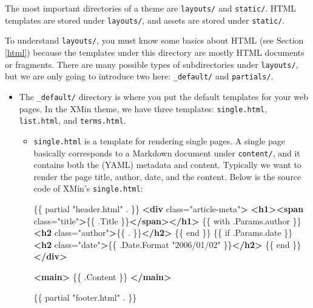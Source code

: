 \documentclass[12pt,]{krantz}
\makeatletter
\newenvironment{Shaded}{\begin{snugshade}}{\end{snugshade}}
\newcommand{\KeywordTok}[1]{\textcolor[rgb]{0.13,0.29,0.53}{\textbf{#1}}}
\newcommand{\NormalTok}[1]{#1}
\newcommand{\OtherTok}[1]{\textcolor[rgb]{0.56,0.35,0.01}{#1}}
\newcommand{\StringTok}[1]{\textcolor[rgb]{0.31,0.60,0.02}{#1}}
\newenvironment{kframe}{%
\medskip{}
\setlength{\fboxsep}{.8em}
 \def\at@end@of@kframe{}%
 \ifinner\ifhmode%
  \def\at@end@of@kframe{\end{minipage}}%
  \begin{minipage}{\columnwidth}%
 \fi\fi%
 \def\FrameCommand##1{\hskip\@totalleftmargin \hskip-\fboxsep
 \colorbox{shadecolor}{##1}\hskip-\fboxsep
     \hskip-\linewidth \hskip-\@totalleftmargin \hskip\columnwidth}%
 \MakeFramed {\advance\hsize-\width
   \@totalleftmargin\z@ \linewidth\hsize
   \@setminipage}}%
 {\par\unskip\endMakeFramed%
 \at@end@of@kframe}
\renewenvironment{Shaded}{\begin{kframe}}{\end{kframe}}
\theoremstyle{definition}
\theoremstyle{definition}
\theoremstyle{definition}
\theoremstyle{remark}
\makeatother
\begin{document}
The most important directories of a theme are \texttt{layouts/} and
\texttt{static/}. HTML templates are stored under \texttt{layouts/}, and
assets are stored under \texttt{static/}.

To understand \texttt{layouts/}, you must know some basics about HTML
(see Section \ref{html}) because the templates under this directory are
mostly HTML documents or fragments. There are many possible types of
subdirectories under \texttt{layouts/}, but we are only going to
introduce two here: \texttt{\_default/} and \texttt{partials/}.

\begin{itemize}
\item
  The \texttt{\_default/} directory is where you put
  the default templates for your web pages. In the XMin theme, we have
  three templates: \texttt{single.html}, \texttt{list.html}, and
  \texttt{terms.html}.

  \begin{itemize}
  \item
    \texttt{single.html} is a template for rendering
    single pages. A single page basically corresponds to a Markdown
    document under \texttt{content/}, and it contains both the (YAML)
    metadata and content. Typically we want to render the page title,
    author, date, and the content. Below is the source code of XMin's
    \texttt{single.html}:

\begin{Shaded}
\begin{Highlighting}[]
\NormalTok{\{\{ partial "header.html" . \}\}}
\KeywordTok{<div}\OtherTok{ class=}\StringTok{"article-meta"}\KeywordTok{>}
\KeywordTok{<h1><span}\OtherTok{ class=}\StringTok{"title"}\KeywordTok{>}\NormalTok{\{\{ .Title \}\}}\KeywordTok{</span></h1>}
\NormalTok{\{\{ with .Params.author \}\}}
\KeywordTok{<h2}\OtherTok{ class=}\StringTok{"author"}\KeywordTok{>}\NormalTok{\{\{ . \}\}}\KeywordTok{</h2>}
\NormalTok{\{\{ end \}\}}
\NormalTok{\{\{ if .Params.date \}\}}
\KeywordTok{<h2}\OtherTok{ class=}\StringTok{"date"}\KeywordTok{>}\NormalTok{\{\{ .Date.Format "2006/01/02" \}\}}\KeywordTok{</h2>}
\NormalTok{\{\{ end \}\}}
\KeywordTok{</div>}

\KeywordTok{<main>}
\NormalTok{\{\{ .Content \}\}}
\KeywordTok{</main>}

\NormalTok{\{\{ partial "footer.html" . \}\}}
\end{Highlighting}
\end{Shaded}


\end{itemize}
\end{itemize}
\end{document}
